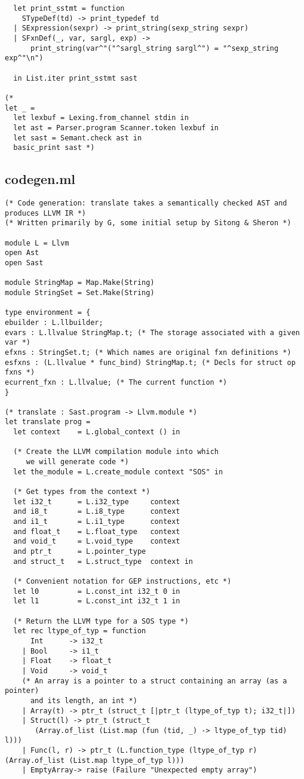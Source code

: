 \documentclass[main.tex]{subfiles}
\begin{document}
\begin{lstlisting}
  let print_sstmt = function
    STypeDef(td) -> print_typedef td
  | SExpression(sexpr) -> print_string(sexp_string sexpr)
  | SFxnDef(_, var, sargl, exp) ->
      print_string(var^"("^sargl_string sargl^") = "^sexp_string exp^"\n")

  in List.iter print_sstmt sast

(*
let _ =
  let lexbuf = Lexing.from_channel stdin in
  let ast = Parser.program Scanner.token lexbuf in
  let sast = Semant.check ast in 
  basic_print sast *)
\end{lstlisting}

\subsection{codegen.ml}
\begin{lstlisting}
(* Code generation: translate takes a semantically checked AST and
produces LLVM IR *)
(* Written primarily by G, some initial setup by Sitong & Sheron *)

module L = Llvm
open Ast
open Sast 

module StringMap = Map.Make(String)
module StringSet = Set.Make(String)

type environment = {
ebuilder : L.llbuilder;
evars : L.llvalue StringMap.t; (* The storage associated with a given var *)
efxns : StringSet.t; (* Which names are original fxn definitions *)
esfxns : (L.llvalue * func_bind) StringMap.t; (* Decls for struct op fxns *)
ecurrent_fxn : L.llvalue; (* The current function *)
}

(* translate : Sast.program -> Llvm.module *)
let translate prog =
  let context    = L.global_context () in
  
  (* Create the LLVM compilation module into which
     we will generate code *)
  let the_module = L.create_module context "SOS" in

  (* Get types from the context *)
  let i32_t      = L.i32_type     context
  and i8_t       = L.i8_type      context
  and i1_t       = L.i1_type      context
  and float_t    = L.float_type   context
  and void_t     = L.void_type    context 
  and ptr_t      = L.pointer_type 
  and struct_t   = L.struct_type  context in

  (* Convenient notation for GEP instructions, etc *)
  let l0         = L.const_int i32_t 0 in
  let l1         = L.const_int i32_t 1 in

  (* Return the LLVM type for a SOS type *)
  let rec ltype_of_typ = function
      Int      -> i32_t
    | Bool     -> i1_t
    | Float    -> float_t
    | Void     -> void_t
    (* An array is a pointer to a struct containing an array (as a pointer)
      and its length, an int *)
    | Array(t) -> ptr_t (struct_t [|ptr_t (ltype_of_typ t); i32_t|])
    | Struct(l) -> ptr_t (struct_t
       (Array.of_list (List.map (fun (tid, _) -> ltype_of_typ tid) l)))
    | Func(l, r) -> ptr_t (L.function_type (ltype_of_typ r) (Array.of_list (List.map ltype_of_typ l)))
    | EmptyArray-> raise (Failure "Unexpected empty array")


\end{lstlisting}
\end{document}
